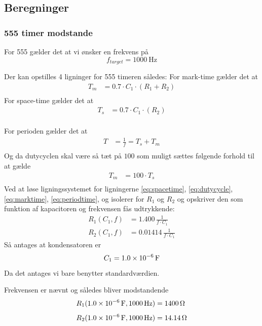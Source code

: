 \subsection{Beregninger}
\subsubsection{555 timer modstande} \label{calc:555timerResistance}
For 555 gælder det at vi ønsker en frekvens på 
\[
	f_{target} =  \SI{1000}{\hertz}
\]

Der kan opstilles 4 ligninger for 555 timeren således: 
For mark-time gælder det at
\begin{align}
	T_m &= 0.7 \cdot C_1 \cdot (R_1 + R_2) \label{eq:marktime} \\
\end{align}
For space-time gælder det at 
\begin{align}
	T_s &= 0.7 \cdot C_1 \cdot (R_2) \label{eq:spacetime} \\
\end{align}

For perioden gælder det at 
\begin{align}
	T &= \frac{1}{f} = T_s + T_m \label{eq:periodtime} \\
\end{align}
Og da dutycyclen skal være så tæt på $100$ som muligt sættes følgende forhold til at gælde
\begin{align}
	T_m &= 100 \cdot  T_s \label{eq:dutycycle} \\
\end{align}
Ved at løse ligningssystemet for ligningerne \ref{eq:spacetime}, \ref{eq:dutycycle}, \ref{eq:marktime}, \ref{eq:periodtime}, og isolerer for $R_1$ og $R_2$ og opskriver den som funktion af kapacitoren og frekvensen fås udtrykkende:
\begin{align}
	R_{1} \left( C_1,f \right) &= 1.400\,{\frac {1}{f \cdot C_1}} \\[2ex]
	R_{2} \left( C_1,f \right) &= 0.01414\,{\frac {1}{f \cdot C_1}}
\end{align}
Så antages at kondensatoren er 
\[
	C_1 = \SI{1.0d-6}{\farad}
\]
Da det antages vi bare benytter standardværdien. 

Frekvensen er nævnt og således bliver modstandende
\begin{align}
	R_1(\SI{1.0d-6}{\farad},\SI{1000}{\hertz})&= \SI{1400}{\ohm} \\[1ex]
	R_2(\SI{1.0d-6}{\farad},\SI{1000}{\hertz})&= \SI{14.14}{\ohm}
\end{align}

